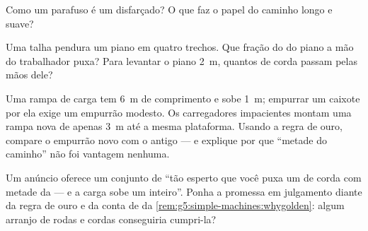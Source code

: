 \begin{exercise}[$\star$]\label{exo:g5:simple-machines:8}
Como um parafuso é um  disfarçado? O que faz o papel
do caminho longo e suave?
\end{exercise}

\begin{exercise}[$\star\star$]\label{exo:g5:simple-machines:9}
Uma talha pendura um piano em quatro trechos. Que fração do  do
piano a mão do trabalhador puxa? Para levantar o piano \qty{2}{m},
quantos  de corda passam pelas mãos dele?
\end{exercise}

\begin{exercise}[$\star\star$]\label{exo:g5:simple-machines:10}
Uma rampa de carga tem \qty{6}{m} de comprimento e sobe \qty{1}{m};
empurrar um caixote por ela exige um empurrão modesto. Os
carregadores impacientes montam uma rampa nova de apenas \qty{3}{m}
até a mesma plataforma. Usando a regra de ouro, compare o empurrão
novo com o antigo --- e explique por que ``metade do caminho'' não
foi vantagem nenhuma.
\end{exercise}

\begin{exercise}[$\star\star$]\label{exo:g5:simple-machines:11}
Um anúncio oferece um conjunto de  ``tão esperto que você
puxa um  de corda com metade da  --- e a carga sobe um
 inteiro''. Ponha a promessa em julgamento diante da regra de
ouro e da conta de  da
\cref{rem:g5:simple-machines:whygolden}: algum arranjo de rodas e
cordas conseguiria cumpri-la?
\end{exercise}
